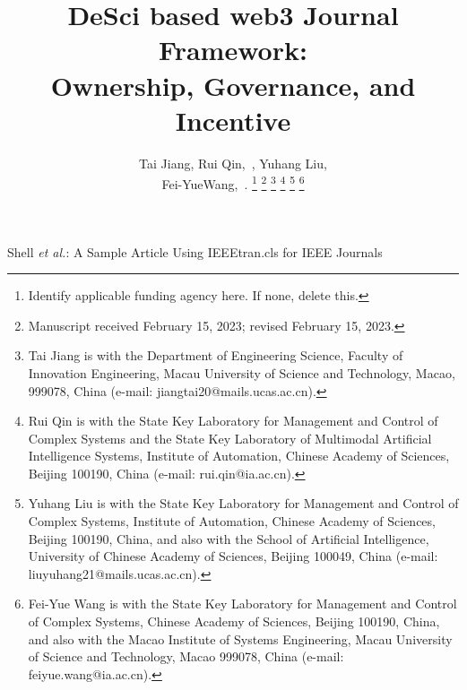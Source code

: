 \documentclass[lettersize,journal]{IEEEtran}
\begin{document}
\title{DeSci based web3 Journal Framework: \\ Ownership, Governance, and Incentive}

\author{Tai Jiang, Rui Qin,~, Yuhang Liu, \\
 Fei-YueWang,~.
\thanks{Identify applicable funding agency here. If none, delete this.}%
\thanks{Manuscript received February 15, 2023; revised February 15, 2023.}
\thanks{Tai Jiang is with the Department of Engineering Science, Faculty of Innovation Engineering, Macau University of Science and Technology, Macao, 999078, China (e-mail: jiangtai20@mails.ucas.ac.cn).}
\thanks{Rui Qin is with the State Key Laboratory for Management and Control of Complex Systems and the State Key Laboratory of Multimodal Artificial Intelligence Systems, Institute of Automation, Chinese Academy of Sciences, Beijing 100190, China (e-mail: rui.qin@ia.ac.cn).}
\thanks{Yuhang Liu is with the State Key Laboratory for Management and Control of Complex Systems, Institute of Automation, Chinese Academy of Sciences, Beijing 100190, China, and also with the School of Artificial Intelligence, University of Chinese Academy of Sciences, Beijing 100049, China (e-mail: liuyuhang21@mails.ucas.ac.cn).}
\thanks{Fei-Yue Wang is with the State Key Laboratory for Management and Control of Complex Systems, Chinese Academy of Sciences, Beijing 100190, China, and also with the Macao Institute of Systems Engineering, Macau University of Science and Technology, Macao 999078, China (e-mail: feiyue.wang@ia.ac.cn).}

}

%
{Shell \MakeLowercase{\textit{et al.}}: A Sample Article Using IEEEtran.cls for IEEE Journals}


\maketitle
\end{document}
